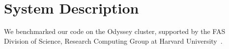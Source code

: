 \section{System Description}

We benchmarked our code on the Odyssey cluster, supported by the FAS Division of
Science, Research Computing Group at Harvard University~\cite{odyssey}.
